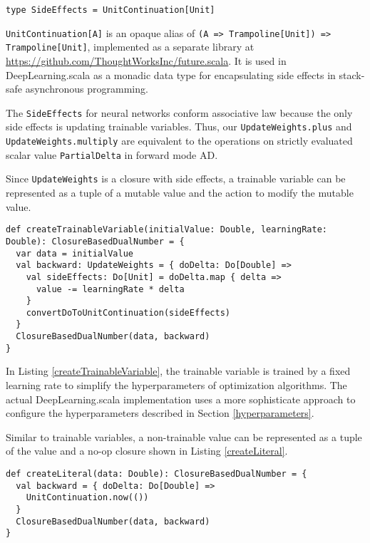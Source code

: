 \begin{lstlisting}[float={htbp},caption={Monadic side-effects}, label={SideEffects}]
type SideEffects = UnitContinuation[Unit]
\end{lstlisting}

\lstinline{UnitContinuation[A]} is an opaque alias \cite{erik2017opaque} of \lstinline{(A => Trampoline[Unit]) => Trampoline[Unit]}, implemented as a separate library at \url{https://github.com/ThoughtWorksInc/future.scala}. It is used in DeepLearning.scala as a monadic data type for encapsulating side effects in stack-safe asynchronous programming.

The \lstinline{SideEffects} for neural networks conform associative law because the only side effects is updating \glspl{trainable variable}. Thus, our \lstinline{UpdateWeights.plus} and \lstinline{UpdateWeights.multiply} are equivalent to the operations on strictly evaluated scalar value \lstinline{PartialDelta} in forward mode AD.

Since \lstinline{UpdateWeights} is a closure with side effects, a \gls{trainable variable} can be represented as a tuple of a mutable value and the action to modify the mutable value.

\begin{lstlisting}[float={htbp},caption={Create a dual number for a \gls{trainable variable}}, label={createTrainableVariable}]
def createTrainableVariable(initialValue: Double, learningRate: Double): ClosureBasedDualNumber = {
  var data = initialValue
  val backward: UpdateWeights = { doDelta: Do[Double] =>
    val sideEffects: Do[Unit] = doDelta.map { delta =>
      value -= learningRate * delta
    }
    convertDoToUnitContinuation(sideEffects)
  }
  ClosureBasedDualNumber(data, backward)
}
\end{lstlisting}

In Listing \ref{createTrainableVariable}, the \gls{trainable variable} is trained by a fixed learning rate to simplify the hyperparameters of optimization algorithms. The actual DeepLearning.scala implementation uses a more sophisticate approach to configure the hyperparameters described in Section \ref{hyperparameters}.

Similar to \glspl{trainable variable}, a non-trainable value can be represented as a tuple of the value and a no-op closure shown in Listing \ref{createLiteral}.

\begin{lstlisting}[float={htbp},caption={Create a dual number for a  non-trainable value}, label={createLiteral}]
def createLiteral(data: Double): ClosureBasedDualNumber = {
  val backward = { doDelta: Do[Double] =>
    UnitContinuation.now(())
  }
  ClosureBasedDualNumber(data, backward)
}
\end{lstlisting}

